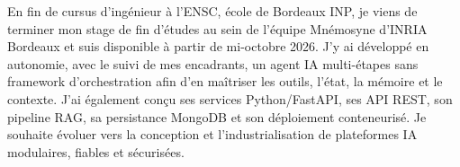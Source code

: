 
\begin{cvparagraph}
En fin de cursus d’ingénieur à l’ENSC, école de Bordeaux INP, je viens de terminer mon stage de fin d’études au sein de l’équipe Mnémosyne d’INRIA Bordeaux et suis disponible à partir de mi-octobre 2026. J’y ai développé en autonomie, avec le suivi de mes encadrants, un agent IA multi-étapes sans framework d’orchestration afin d’en maîtriser les outils, l’état, la mémoire et le contexte. J’ai également conçu ses services Python/FastAPI, ses API REST, son pipeline RAG, sa persistance MongoDB et son déploiement conteneurisé. Je souhaite évoluer vers la conception et l’industrialisation de plateformes IA modulaires, fiables et sécurisées.
\end{cvparagraph}
